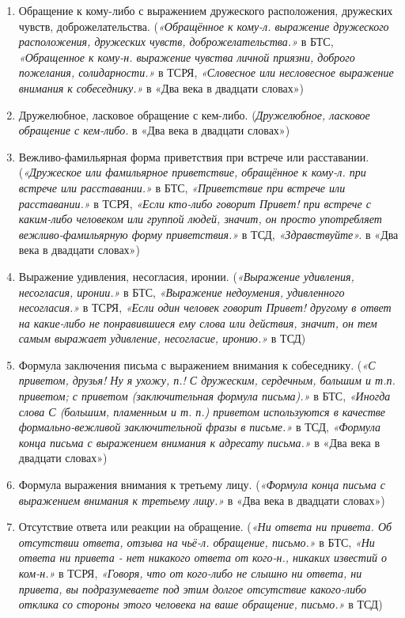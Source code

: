 \begin{enumerate}
    \item Обращение к кому-либо с выражением дружеского расположения, дружеских чувств, доброжелательства.
(\textit{«Обращённое к кому-л. выражение дружеского расположения, дружеских чувств, доброжелательства.»} в БТС,
\textit{«Обращенное к кому-н. выражение чувства личной приязни, доброго пожелания, солидарности.»} в ТСРЯ,
\textit{«Словесное или несловесное выражение внимания к собеседнику.»} в «Два века в двадцати словах»)

    \item Дружелюбное, ласковое обращение с кем-либо.
(\textit{Дружелюбное, ласковое обращение с кем-либо.} в «Два века в двадцати словах»)

    \item Вежливо-фамильярная форма приветствия при встрече или расставании.
(\textit{«Дружеское или фамильярное приветствие, обращённое к кому-л. при встрече или расставании.»} в БТС,
\textit{«Приветствие при встрече или расставании.»} в ТСРЯ,
\textit{«Если кто-либо говорит Привет! при встрече с каким-либо человеком или группой людей,
значит, он просто употребляет вежливо-фамильярную форму приветствия.»} в ТСД,
\textit{«Здравствуйте».} в «Два века в двадцати словах»)

    \item Выражение удивления, несогласия, иронии.
(\textit{«Выражение удивления, несогласия, иронии.»} в БТС,
\textit{«Выражение недоумения, удивленного несогласия.»} в ТСРЯ,
\textit{«Если один человек говорит Привет! другому в ответ на какие-либо
не понравившиеся ему слова или действия, значит, он тем самым выражает удивление, несогласие, иронию.»} в ТСД)

    \item Формула заключения письма с выражением внимания к собеседнику.
(\textit{«С приветом, друзья! Ну я ухожу, п.! С дружеским, сердечным, большим и т.п. приветом;
с приветом (заключительная формула письма).»} в БТС,
\textit{«Иногда слова С (большим, пламенным и т. п.) приветом используются в качестве
формально-вежливой заключительной фразы в письме.»} в ТСД,
\textit{«Формула конца письма с выражением внимания к адресату письма.»} в «Два века в двадцати словах»)

    \item Формула выражения внимания к третьему лицу.
(\textit{«Формула конца письма с выражением внимания к третьему лицу.»} в «Два века в двадцати словах»)

    \item Отсутствие ответа или реакции на обращение.
(\textit{«Ни ответа ни привета. Об отсутствии ответа, отзыва на чьё-л. обращение, письмо.»} в БТС,
\textit{«Ни ответа ни привета - нет никакого ответа от кого-н., никаких известий о ком-н.»} в ТСРЯ,
\textit{«Говоря, что от кого-либо не слышно ни ответа, ни привета,
вы подразумеваете под этим долгое отсутствие какого-либо отклика со стороны этого человека
на ваше обращение, письмо.»} в ТСД)


\end{enumerate}
